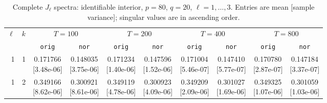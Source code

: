 \documentclass[12pt,letterpaper]{article}
\def\spacingset#1{\renewcommand{\baselinestretch}{#1}\small\normalsize}
\theoremstyle{plain}
\theoremstyle{definition}
\begin{document}
\begin{table}[p]
\begingroup
\spacingset{1.0}
\small\centering
\caption{Complete $J_\ell$ spectra: identifiable interior, $p=80$, $q=20$, $\ell=1,\ldots,3$. Entries are mean [sample variance]; singular values are in ascending order.}
\label{s23:lambda:alltab:spectra:p80q20interior:1-3}
\footnotesize
\setlength{\tabcolsep}{2.2pt}
\renewcommand{\arraystretch}{1.03}
\begin{adjustbox}{max width=\linewidth}
\begin{tabular}{@{}rr*{8}{c}@{}}
\toprule
$\ell$ & $k$ & \multicolumn{2}{c}{$T=100$} & \multicolumn{2}{c}{$T=200$} & \multicolumn{2}{c}{$T=400$} & \multicolumn{2}{c}{$T=800$}\\
\cmidrule(lr){3-4}\cmidrule(lr){5-6}\cmidrule(lr){7-8}\cmidrule(lr){9-10}
 &  & \texttt{orig} & \texttt{nor} & \texttt{orig} & \texttt{nor} & \texttt{orig} & \texttt{nor} & \texttt{orig} & \texttt{nor}\\
\midrule
1 & 1 & \shortstack{0.171766\\[-1pt]{\scriptsize[3.48e-06]}} & \shortstack{0.148035\\[-1pt]{\scriptsize[3.75e-06]}} & \shortstack{0.171234\\[-1pt]{\scriptsize[1.40e-06]}} & \shortstack{0.147596\\[-1pt]{\scriptsize[1.52e-06]}} & \shortstack{0.171004\\[-1pt]{\scriptsize[5.46e-07]}} & \shortstack{0.147410\\[-1pt]{\scriptsize[5.77e-07]}} & \shortstack{0.170780\\[-1pt]{\scriptsize[2.87e-07]}} & \shortstack{0.147184\\[-1pt]{\scriptsize[3.37e-07]}}\\
1 & 2 & \shortstack{0.349166\\[-1pt]{\scriptsize[8.62e-06]}} & \shortstack{0.300921\\[-1pt]{\scriptsize[8.61e-06]}} & \shortstack{0.349119\\[-1pt]{\scriptsize[4.78e-06]}} & \shortstack{0.300923\\[-1pt]{\scriptsize[4.09e-06]}} & \shortstack{0.349209\\[-1pt]{\scriptsize[2.09e-06]}} & \shortstack{0.301027\\[-1pt]{\scriptsize[1.69e-06]}} & \shortstack{0.349325\\[-1pt]{\scriptsize[1.07e-06]}} & \shortstack{0.301059\\[-1pt]{\scriptsize[1.03e-06]}}\\

\end{tabular}
\end{adjustbox}
\end{table}
\end{document}
